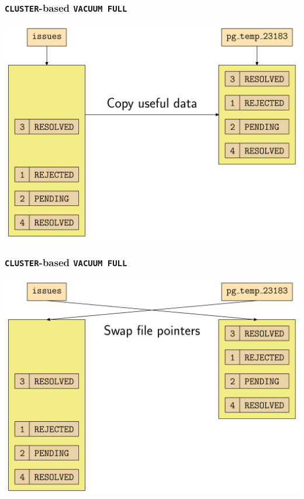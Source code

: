 \begin{frame}
  \frametitle{\texttt{CLUSTER}-based \texttt{VACUUM FULL}}
  \includegraphics[height=\sizeforimages\textheight]{images/vacuum_full_01.png}
\end{frame}

\begin{frame}
  \frametitle{\texttt{CLUSTER}-based \texttt{VACUUM FULL}}
  \includegraphics[height=\sizeforimages\textheight]{images/vacuum_full_02.png}
\end{frame}

